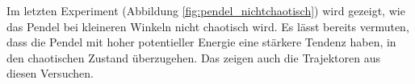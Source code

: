 Im letzten Experiment (Abbildung \ref{fig:pendel_nichtchaotisch}) wird gezeigt,
wie das Pendel bei kleineren Winkeln nicht chaotisch wird.
Es lässt bereits vermuten, dass die Pendel mit hoher potentieller Energie eine stärkere Tendenz haben,
in den chaotischen Zustand überzugehen.
Das zeigen auch die Trajektoren aus diesen Versuchen.

